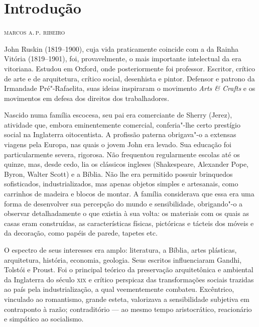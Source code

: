 \chapter*{Introdução}

\begin{flushright}
\textsc{marcos a.\,p. ribeiro}
\end{flushright}\medskip

\noindent{}John Ruskin (1819--1900), cuja vida praticamente coincide com a da Rainha
Vitória (1819--1901), foi, provavelmente, o mais importante intelectual da
era vitoriana. Estudou em Oxford, onde posteriormente foi professor.
Escritor, crítico de arte e de arquitetura, crítico social, desenhista e
pintor. Defensor e patrono da Irmandade Pré"-Rafaelita, suas ideias
inspiraram o movimento \emph{Arts \& Crafts} e os movimentos em defesa
dos direitos dos trabalhadores.

Nascido numa família escocesa, seu pai era comerciante de Sherry
(Jerez), atividade que, embora eminentemente comercial, conferia"-lhe
certo prestígio social na Inglaterra oitocentista. A profissão paterna
obrigava"-o a extensas viagens pela Europa, nas quais o jovem John era
levado. Sua educação foi particularmente severa, rigorosa. Não
frequentou regularmente escolas até os quinze, mas, desde cedo, lia os
clássicos ingleses (Shakespeare, Alexander Pope, Byron, Walter Scott) e
a Bíblia. Não lhe era permitido possuir brinquedos sofisticados,
industrializados, mas apenas objetos simples e artesanais, como
carrinhos de madeira e blocos de montar. A família considerava que essa
era uma forma de desenvolver sua percepção do mundo e sensibilidade,
obrigando"-o a observar detalhadamente o que existia à sua volta: os
materiais com os quais as casas eram construídas, as características
físicas, pictóricas e tácteis dos móveis e da decoração, como papéis de
parede, tapetes etc.

O espectro de seus interesses era amplo: literatura, a Bíblia, artes
plásticas, arquitetura, história, economia, geologia. Seus escritos
influenciaram Gandhi, Tolstói e Proust. Foi o principal teórico da
preservação arquitetônica e ambiental da Inglaterra do século \textsc{xix} e
crítico perspicaz das transformações sociais trazidas ao país pela
industrialização, a qual veementemente combateu. Excêntrico, vinculado
ao romantismo, grande esteta, valorizava a sensibilidade subjetiva em
contraponto à razão; contraditório --- ao mesmo tempo aristocrático,
reacionário e simpático ao socialismo.

